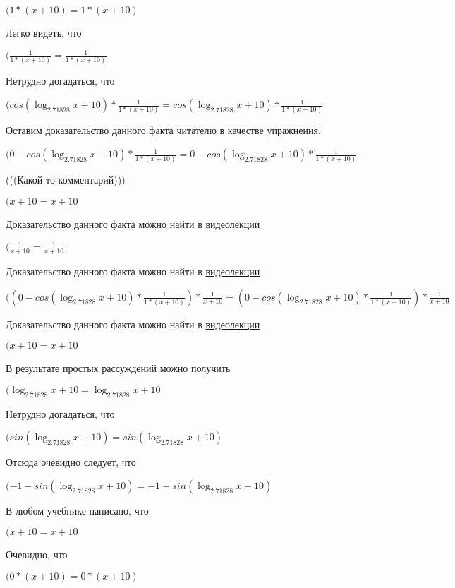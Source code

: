 \documentclass[12pt,a4paper,fleqn]{article}
\theoremstyle{definition}
\begin{document}
$( 1  * ( x  +  10 ) =  1  * ( x  +  10 )$

Легко видеть, что

$(\frac{ 1 }{ 1  * ( x  +  10 )}
 = \frac{ 1 }{ 1  * ( x  +  10 )}
$

Нетрудно догадаться, что

$(cos(\log_{ 2.71828 }{ x  +  10 }) * \frac{ 1 }{ 1  * ( x  +  10 )}
 = cos(\log_{ 2.71828 }{ x  +  10 }) * \frac{ 1 }{ 1  * ( x  +  10 )}
$

Оставим доказательство данного факта читателю в качестве упражнения.

$( 0  - cos(\log_{ 2.71828 }{ x  +  10 }) * \frac{ 1 }{ 1  * ( x  +  10 )}
 =  0  - cos(\log_{ 2.71828 }{ x  +  10 }) * \frac{ 1 }{ 1  * ( x  +  10 )}
$

(((Какой-то комментарий)))

$( x  +  10  =  x  +  10 $

Доказательство данного факта можно найти в \href{https://www.youtube.com/watch?v=dQw4w9WgXcQ}{видеолекции}

$(\frac{ 1 }{ x  +  10 }
 = \frac{ 1 }{ x  +  10 }
$

Доказательство данного факта можно найти в \href{https://www.youtube.com/watch?v=dQw4w9WgXcQ}{видеолекции}

$(( 0  - cos(\log_{ 2.71828 }{ x  +  10 }) * \frac{ 1 }{ 1  * ( x  +  10 )}
) * \frac{ 1 }{ x  +  10 }
 = ( 0  - cos(\log_{ 2.71828 }{ x  +  10 }) * \frac{ 1 }{ 1  * ( x  +  10 )}
) * \frac{ 1 }{ x  +  10 }
$

Доказательство данного факта можно найти в \href{https://www.youtube.com/watch?v=dQw4w9WgXcQ}{видеолекции}

$( x  +  10  =  x  +  10 $

В результате простых рассуждений можно получить

$(\log_{ 2.71828 }{ x  +  10 } = \log_{ 2.71828 }{ x  +  10 }$

Нетрудно догадаться, что

$(sin(\log_{ 2.71828 }{ x  +  10 }) = sin(\log_{ 2.71828 }{ x  +  10 })$

Отсюда очевидно следует, что

$( -1  - sin(\log_{ 2.71828 }{ x  +  10 }) =  -1  - sin(\log_{ 2.71828 }{ x  +  10 })$

В любом учебнике написано, что

$( x  +  10  =  x  +  10 $

Очевидно, что

$( 0  * ( x  +  10 ) =  0  * ( x  +  10 )$
\end{document}

